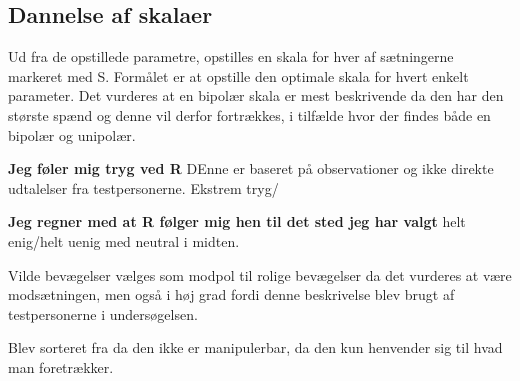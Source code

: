 \subsection{Dannelse af skalaer}
Ud fra de opstillede parametre, opstilles en skala for hver af sætningerne markeret med S. Formålet er at opstille den optimale skala for hvert enkelt parameter. 
Det vurderes at en bipolær skala er mest beskrivende da den har den største spænd og denne vil derfor fortrækkes, i tilfælde hvor der findes både en bipolær og unipolær. 


\textbf{Jeg føler mig tryg ved R}
DEnne er baseret på observationer og ikke direkte udtalelser fra testpersonerne. 
Ekstrem tryg/

\textbf{Jeg regner med at R følger mig hen til det sted jeg har valgt} 
helt enig/helt uenig med neutral i midten. 

Vilde bevægelser vælges som modpol til rolige bevægelser da det vurderes at være modsætningen, men også i høj grad fordi denne beskrivelse blev brugt af testpersonerne i undersøgelsen. 

Blev sorteret fra da den ikke er manipulerbar, da den kun henvender sig til hvad man foretrækker. 